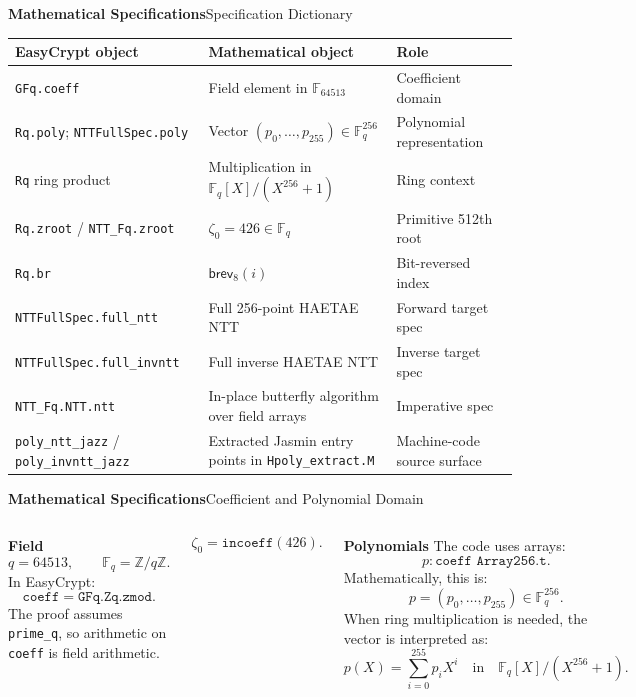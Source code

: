 \documentclass[10pt,aspectratio=1610,compress,dvipsnames]{beamer}
\newcommand{\brev}{\ensuremath{\mathsf{brev}}}
\newcommand{\ec}[1]{\texttt{#1}}
\begin{document}
\begin{frame}{\bfseries Mathematical Specifications}{Specification Dictionary}
\begin{center}
\scriptsize\renewcommand{\arraystretch}{1.24}
\setlength{\tabcolsep}{2pt}
\begin{tabular}{p{3.55cm}p{4.95cm}p{3.75cm}}
\toprule[1.2pt]
\textbf{EasyCrypt object} & \textbf{Mathematical object} & \textbf{Role} \\
\midrule
\ec{GFq.coeff} & Field element in $\mathbb{F}_{64513}$ & Coefficient domain \\
\ec{Rq.poly}; \ec{NTTFullSpec.poly} & Vector $(p_0,\ldots,p_{255})\in\mathbb{F}_q^{256}$ & Polynomial representation \\
\ec{Rq} ring product & Multiplication in $\mathbb{F}_q[X]/(X^{256}+1)$ & Ring context \\
\ec{Rq.zroot} / \ec{NTT\_Fq.zroot} & $\zeta_0=426\in\mathbb{F}_q$ & Primitive 512th root \\
\ec{Rq.br} & $\brev_8(i)$ & Bit-reversed index \\
\ec{NTTFullSpec.full\_ntt} & Full 256-point HAETAE NTT & Forward target spec \\
\ec{NTTFullSpec.full\_invntt} & Full inverse HAETAE NTT & Inverse target spec \\
\ec{NTT\_Fq.NTT.ntt} & In-place butterfly algorithm over field arrays & Imperative spec \\
\ec{poly\_ntt\_jazz} / \ec{poly\_invntt\_jazz} & Extracted Jasmin entry points in \ec{Hpoly\_extract.M} & Machine-code source surface \\
\bottomrule[1.2pt]
\end{tabular}
\end{center}
\end{frame}

\begin{frame}{\bfseries Mathematical Specifications}{Coefficient and Polynomial Domain}
\begin{columns}[T]
\textbf{Field}
\small
\[
  q = 64513,
  \qquad
  \mathbb{F}_q = \mathbb{Z}/q\mathbb{Z}.
\]
In EasyCrypt:
\[
  \ec{coeff} = \ec{GFq.Zq.zmod}.
\]
The proof assumes \ec{prime\_q}, so arithmetic on \ec{coeff} is field
arithmetic.

\vspace{6pt}
\[
  \zeta_0 = \ec{incoeff}(426).
\]

\textbf{Polynomials}
\small
The code uses arrays:
\[
  p : \ec{coeff Array256.t}.
\]
Mathematically, this is:
\[
  p=(p_0,\ldots,p_{255})\in\mathbb{F}_q^{256}.
\]
When ring multiplication is needed, the vector is interpreted as:
\[
  p(X)=\sum_{i=0}^{255}p_iX^i
  \quad\text{in}\quad
  \mathbb{F}_q[X]/(X^{256}+1).
\]
\end{columns}
\end{frame}
\end{document}
